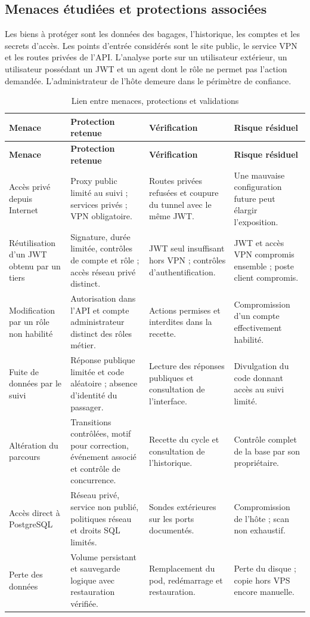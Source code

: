 \documentclass[11pt]{extarticle}
\begin{document}
\subsection{Menaces étudiées et protections associées}
Les biens à protéger sont les données des bagages, l'historique, les comptes et les secrets d'accès. Les points d'entrée considérés sont le site public, le service VPN et les routes privées de l'API. L'analyse porte sur un utilisateur extérieur, un utilisateur possédant un JWT et un agent dont le rôle ne permet pas l'action demandée. L'administrateur de l'hôte demeure dans le périmètre de confiance.
{
\begin{longtable}{p{3.1cm}p{4.6cm}p{3.1cm}p{2.6cm}}
\caption{Lien entre menaces, protections et validations}\label{tab:menaces}\\\toprule
\textbf{Menace} & \textbf{Protection retenue} & \textbf{Vérification} & \textbf{Risque résiduel}\\\midrule\endfirsthead
\toprule\textbf{Menace} & \textbf{Protection retenue} & \textbf{Vérification} & \textbf{Risque résiduel}\\\midrule\endhead
Accès privé depuis Internet & Proxy public limité au suivi ; services privés ; VPN obligatoire. & Routes privées refusées et coupure du tunnel avec le même JWT. & Une mauvaise configuration future peut élargir l'exposition.\\
Réutilisation d'un JWT obtenu par un tiers & Signature, durée limitée, contrôles de compte et rôle ; accès réseau privé distinct. & JWT seul insuffisant hors VPN ; contrôles d'authentification. & JWT et accès VPN compromis ensemble ; poste client compromis.\\
Modification par un rôle non habilité & Autorisation dans l'API et compte administrateur distinct des rôles métier. & Actions permises et interdites dans la recette. & Compromission d'un compte effectivement habilité.\\
Fuite de données par le suivi & Réponse publique limitée et code aléatoire ; absence d'identité du passager. & Lecture des réponses publiques et consultation de l'interface. & Divulgation du code donnant accès au suivi limité.\\
Altération du parcours & Transitions contrôlées, motif pour correction, événement associé et contrôle de concurrence. & Recette du cycle et consultation de l'historique. & Contrôle complet de la base par son propriétaire.\\
Accès direct à PostgreSQL & Réseau privé, service non publié, politiques réseau et droits SQL limités. & Sondes extérieures sur les ports documentés. & Compromission de l'hôte ; scan non exhaustif.\\
Perte des données & Volume persistant et sauvegarde logique avec restauration vérifiée. & Remplacement du pod, redémarrage et restauration. & Perte du disque ; copie hors VPS encore manuelle.\\\bottomrule
\end{longtable}}
\end{document}
